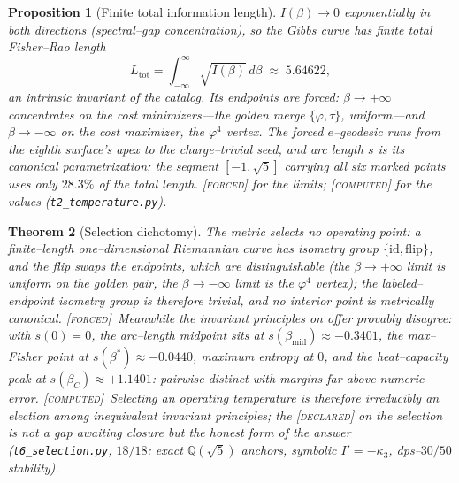 \documentclass[11pt]{article}
\newtheorem{theorem}{Theorem}[section]
\newtheorem{proposition}[theorem]{Proposition}
\theoremstyle{definition}
\newcommand{\ph}{\varphi}
\newcommand{\Q}{\mathbb{Q}}
\newcommand{\forcedtag}{{\scshape [forced]}}
\newcommand{\declaredtag}{{\scshape [declared]}}
\newcommand{\computedtag}{{\scshape [computed]}}
\begin{document}
\begin{proposition}[Finite total information length]\label{prop:ltot}
$I(\beta)\to0$ exponentially in both directions (spectral--gap concentration), so the Gibbs curve has
finite total Fisher--Rao length
\[
L_{\mathrm{tot}}=\int_{-\infty}^{\infty}\!\sqrt{I(\beta)}\,d\beta\;\approx\;5.64622 ,
\]
an intrinsic invariant of the catalog. Its endpoints are forced: $\beta\to+\infty$ concentrates on the
cost minimizers---the golden merge $\{\ph,\tau\}$, uniform---and $\beta\to-\infty$ on the cost
maximizer, the $\ph^4$ vertex. The forced $e$--geodesic runs from the eighth surface's apex to the
charge--trivial seed, and arc length $s$ is its canonical parametrization; the segment
$[-1,\sqrt5]$ carrying all six marked points uses only $28.3\%$ of the total length. \forcedtag{} for
the limits; \computedtag{} for the values (\texttt{t2\_temperature.py}).
\end{proposition}

\begin{theorem}[Selection dichotomy]\label{thm:dichotomy}
The metric selects no operating point: a finite--length one--dimensional Riemannian curve has
isometry group $\{\mathrm{id},\mathrm{flip}\}$, and the flip swaps the endpoints, which are
distinguishable (the $\beta\to+\infty$ limit is uniform on the golden pair, the
$\beta\to-\infty$ limit is the $\ph^4$ vertex); the labeled--endpoint isometry group is therefore
trivial, and no interior point is metrically canonical. \forcedtag\ Meanwhile the invariant
principles on offer provably disagree: with $s(0)=0$, the arc--length midpoint sits at
$s(\beta_{\mathrm{mid}})\approx-0.3401$, the max--Fisher point at $s(\beta^\ast)\approx-0.0440$,
maximum entropy at $0$, and the heat--capacity peak at $s(\beta_C)\approx+1.1401$: pairwise
distinct with margins far above numeric error. \computedtag\ Selecting an operating temperature is
therefore \emph{irreducibly} an election among inequivalent invariant principles; the
\declaredtag{} on the selection is not a gap awaiting closure but the honest form of the answer
(\texttt{t6\_selection.py}, $18/18$: exact $\Q(\sqrt5)$ anchors, symbolic $I'=-\kappa_3$,
dps--$30/50$ stability).
\end{theorem}
\end{document}
